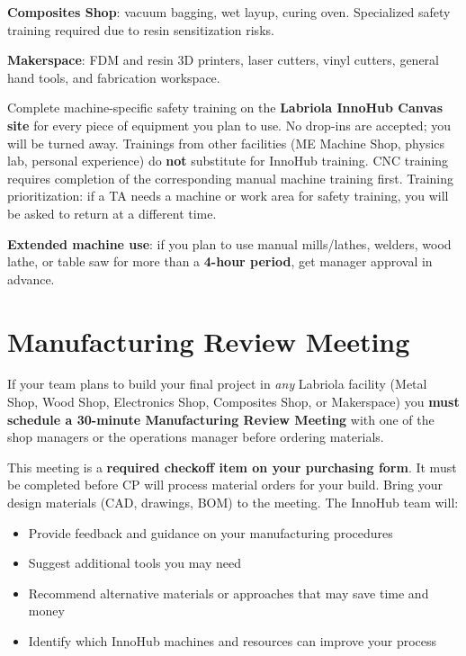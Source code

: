 \textbf{Composites Shop}: vacuum bagging, wet layup, curing oven. Specialized safety training required due to resin sensitization risks.

\textbf{Makerspace}: FDM and resin 3D printers, laser cutters, vinyl cutters, general hand tools, and fabrication workspace.

\begin{warningbox}
Complete machine-specific safety training on the \textbf{Labriola InnoHub Canvas site} for every piece of equipment you plan to use. No drop-ins are accepted; you will be turned away. Trainings from other facilities (ME Machine Shop, physics lab, personal experience) do \textbf{not} substitute for InnoHub training. CNC training requires completion of the corresponding manual machine training first. Training prioritization: if a TA needs a machine or work area for safety training, you will be asked to return at a different time.
\end{warningbox}

\textbf{Extended machine use}: if you plan to use manual mills/lathes, welders, wood lathe, or table saw for more than a \textbf{4-hour period}, get manager approval in advance.

\section{Manufacturing Review Meeting}
If your team plans to build your final project in \emph{any} Labriola facility (Metal Shop, Wood Shop, Electronics Shop, Composites Shop, or Makerspace) you \textbf{must schedule a 30-minute Manufacturing Review Meeting} with one of the shop managers or the operations manager before ordering materials.

This meeting is a \textbf{required checkoff item on your purchasing form}. It must be completed before CP will process material orders for your build. Bring your design materials (CAD, drawings, BOM) to the meeting. The InnoHub team will:
\begin{itemize}[nosep,leftmargin=1.5em]
\item Provide feedback and guidance on your manufacturing procedures
\item Suggest additional tools you may need
\item Recommend alternative materials or approaches that may save time and money
\item Identify which InnoHub machines and resources can improve your process
\end{itemize}

